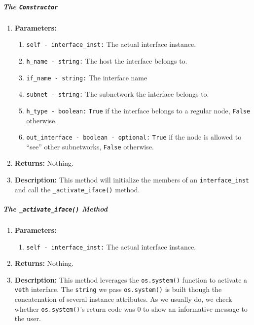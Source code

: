                     \subparagraph{The \texttt{Constructor}}
                        \begin{enumerate}
                            \item \textbf{Parameters:}
                            \begin{enumerate}
                                \item \texttt{self - interface\_inst:} The actual interface instance.
                                \item \texttt{h\_name - string:} The host the interface belongs to.
                                \item \texttt{if\_name - string:} The interface name
                                \item \texttt{subnet - string:} The subnetwork the interface belongs to.
                                \item \texttt{h\_type - boolean:} \texttt{True} if the interface belongs to a regular node, \texttt{False} otherwise.
                                \item \texttt{out\_interface - boolean - optional:} \texttt{True} if the node is allowed to ``see'' other subnetworks, \texttt{False} otherwise.
                            \end{enumerate}
                            \item \textbf{Returns:} Nothing.
                            \item \textbf{Description:} This method will initialize the members of an \texttt{interface\_inst} and call the \texttt{\_activate\_iface()} method.
                        \end{enumerate}

                    \subparagraph{The \texttt{\_activate\_iface()} Method}
                        \begin{enumerate}
                            \item \textbf{Parameters:}
                            \begin{enumerate}
                                \item \texttt{self - interface\_inst:} The actual interface instance.
                            \end{enumerate}
                            \item \textbf{Returns:} Nothing.
                            \item \textbf{Description:} This method leverages the \texttt{os.system()} function to activate a \texttt{veth} interface. The \texttt{string} we pass \texttt{os.system()} is built though the concatenation of several instance attributes. As we usually do, we check whether \texttt{os.system()}'s return code was $0$ to show an informative message to the user.
                        \end{enumerate}


